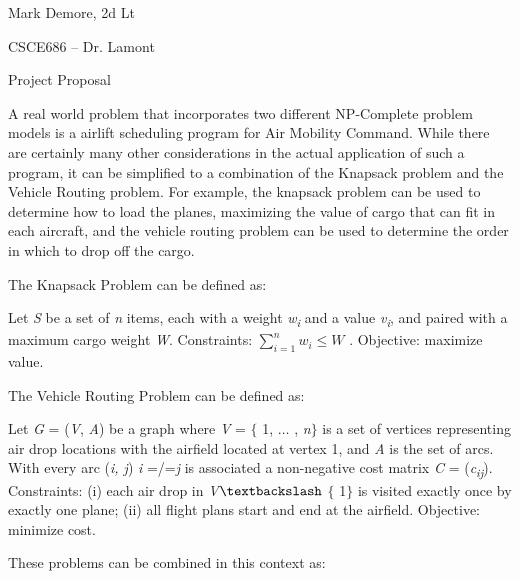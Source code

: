 \documentclass[12pt]{article}
\renewcommand{\_}{\kern-1.5pt\textunderscore\kern-1.5pt}
\begin{document}
Mark Demore, 2d Lt\par

CSCE686 – Dr. Lamont\par

Project Proposal\par


\vspace{\baselineskip}
\tab A real world problem that incorporates two different NP-Complete problem models is a airlift scheduling program for Air Mobility Command. While there are certainly many other considerations in the actual application of such a program, it can be simplified to a combination of the Knapsack problem and the Vehicle Routing problem. For example, the knapsack problem can be used to determine how to load the planes, maximizing the value of cargo that can fit in each aircraft, and the vehicle routing problem can be used to determine the order in which to drop off the cargo.\par

The Knapsack Problem can be defined as:\par

Let \textit{S} be a set of \textit{n} items, each with a weight \textit{w\textsubscript{i}} and a value \textit{v\textsubscript{i}}, and paired with a maximum cargo weight \textit{W}. Constraints:  \(  \sum _{i=1}^{n}w_{i}  \leq W \) . Objective: maximize value.\par

The Vehicle Routing Problem can be defined as:\par

Let \textit{G} = (\textit{V}, \textit{A}) be a graph where \textit{V} = $ \{ $ 1, $ \ldots $ , \textit{n}$ \} $  is a set of vertices representing air drop locations with the airfield located at vertex 1, and \textit{A} is the set of arcs. With every arc (\textit{i, j}) \textit{i} =/=\textit{j} is associated a non-negative cost matrix \textit{C} = (\textit{c\textsubscript{ij}}). Constraints: (i) each air drop in \textit{V}$\textbackslash$ $ \{ $ 1$ \} $  is visited exactly once by exactly one plane; (ii) all flight plans start and end at the airfield. Objective: minimize cost.\par

These problems can be combined in this context as:\par
\end{document}
